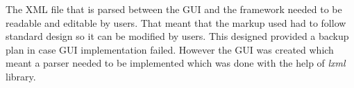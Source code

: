 The XML file that is parsed between the GUI and the framework needed to be readable and editable by users. That meant that the
markup used had to follow standard design so it can be modified by users.
This designed provided a backup plan in case GUI implementation failed. However the GUI was created
which meant a parser needed to be implemented which was done with the help of \textit{lxml} library.